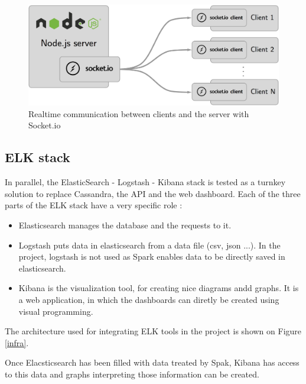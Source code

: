 \documentclass[11pt]{article}
\begin{document}
\begin{figure}[h!]
    \centering
    \includegraphics[scale=0.12]{img/api-dashboard-socket.png}
    \caption{Realtime communication between clients and the server with \textsf{Socket.io}}
    \label{socket}
\end{figure}

\subsection{ELK stack}

In parallel, the \textsf{ElasticSearch} - \textsf{Logstash} - \textsf{Kibana} stack is tested as a turnkey solution to replace \textsf{Cassandra}, the API and the web dashboard.
Each of the three parts of the ELK stack have a very specific role : 
\begin{itemize}
\item Elasticsearch manages the database and the requests to it.
\item Logstash puts data in elasticsearch from a data file (csv, json ...). In the project, logstash is not used as Spark enables data to be directly saved in elasticsearch.
\item Kibana is the visualization tool, for creating nice diagrams andd graphs. It is a web application, in which the dashboards can diretly be created using visual programming.
\end{itemize}

The architecture used for integrating ELK tools in the project is shown on Figure \ref*{infra}.


Once Elacsticsearch has been filled with data treated by Spak, Kibana has access to this data and graphs interpreting those information can be created.
\end{document}
